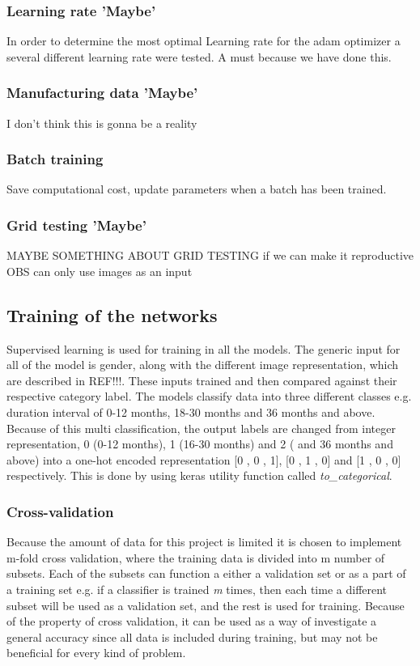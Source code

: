 \subsubsection{Learning rate 'Maybe'}
In order to determine the most optimal Learning rate for the adam optimizer a several different learning rate were tested. 
A must because we have done this. 


\subsubsection{Manufacturing data 'Maybe'}
I don't think this is gonna be a reality 


\subsubsection{Batch training}
Save computational cost, update parameters when a batch has been trained. 

 
\subsubsection{Grid testing 'Maybe'}
MAYBE SOMETHING ABOUT GRID TESTING if we can make it reproductive
OBS can only use images as an input

 
 
\subsection{Training of the networks}
Supervised learning is used for training in all the models. The generic input for all of the model is gender, along with the different image representation, which are described in REF!!!. These inputs trained and then compared against their respective category label.   
The models classify data into three different classes e.g. duration interval of 0-12 months, 18-30 months and 36 months and above. Because of this multi classification, the output labels are changed from integer representation, 0 (0-12 months), 1 (16-30 months) and 2 ( and 36 months and above) into a one-hot encoded representation [0 , 0 , 1], [0 , 1 , 0] and [1 , 0 , 0] respectively. This is done by using keras utility function called \textit{to\_categorical}. 

\subsubsection{Cross-validation}
Because the amount of data for this project is limited it is chosen to implement m-fold cross validation, where the training data is divided into m number of subsets. Each of the subsets can function a either a validation set or as a part of a training set e.g. if a classifier is trained \textit{m} times, then each time a different subset will be used as a validation set, and the rest is used for training. \citep{Duda2000}
Because of the property of cross validation, it can be used as a way of investigate a general accuracy since all data is included during training, but may not be beneficial for every kind of problem. \citep{Duda2000}

